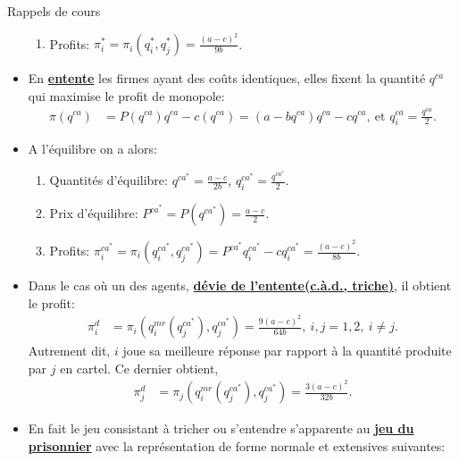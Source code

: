 \begin{frame}[allowframebreaks]{Rappels de cours}
\begin{itemize}
\begin{enumerate}[-]
        \item Profits: $\pi_i^* = \pi_i(q_i^*, q_j^*) = \frac{(a-c)^2}{9b}$.
    \end{enumerate}
    \framebreak
    \item En \textbf{\underline{entente}} les firmes ayant des coûts identiques, elles fixent la quantité $q^{ca}$ qui maximise le profit de monopole:
    \begin{align*}
        \pi(q^{ca}) &= P(q^{ca})q^{ca} - c(q^{ca}) = (a-b q^{ca})q^{ca} - cq^{ca}, \ \text{et $q_i^{ca} = \frac{q^{ca}}{2}$}.
    \end{align*}
    \item A l'équilibre on a alors:
    \begin{enumerate}[-]
        \item Quantités d'équilibre: $q^{ca^*} = \frac{a-c}{2b}$, $q_i^{ca^*} = \frac{q^{ca^*}}{2}$.
        \item Prix d'équilibre: $P^{ca^*} = P(q^{ca^*}) = \frac{a-c}{2}$.
        \item Profits: $\pi_i^{ca^*} = \pi_i(q_i^{ca^*}, q_j^{ca^*}) = P^{ca^*} q_i^{ca^*} - c q_i^{ca^*} = \frac{(a-c)^2}{8b}$.
    \end{enumerate}

    \framebreak
    \item Dans le cas où un des agents, \textbf{\underline{dévie de l'entente(c.à.d., triche)}}, il obtient le profit:
    \begin{align*}
     \pi_i^d &= \pi_i\left(q_i^{mr}(q_j^{ca^*}), q_j^{ca^*}\right) = \frac{9(a-c)^2}{64b}, \ i, j=1, 2, \ i\neq j.
    \end{align*}
    Autrement dit, $i$ joue sa meilleure réponse par rapport à la quantité produite par $j$ en cartel. Ce dernier obtient, 
    \begin{align*}
        \pi_j^d&= \pi_j\left(q_i^{mr}(q_j^{ca^*}), q_j^{ca^*}\right) =\frac{3(a-c)^2}{32b}.
    \end{align*}

\framebreak

\item En fait le jeu consistant à tricher ou s'entendre s'apparente au
 \textbf{\underline{jeu du prisonnier}} avec la représentation de forme normale et extensives suivantes:




\end{itemize}
\end{frame}
